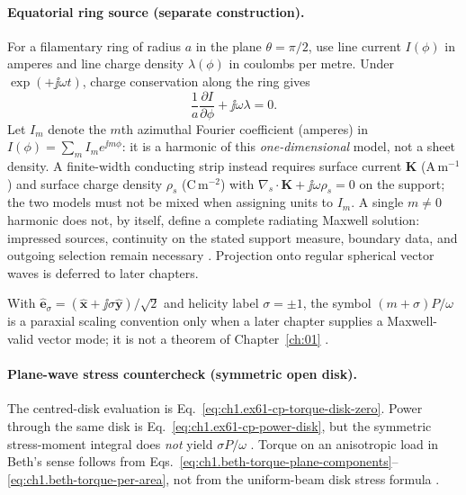 \paragraph{Equatorial ring source (separate construction).}
For a filamentary ring of radius $a$ in the plane $\theta=\pi/2$, use line current $I(\phi)$ in amperes and line charge density $\lambda(\phi)$ in coulombs per metre. Under $\exp(+\jj\omega t)$, charge conservation along the ring gives
\[
\frac{1}{a}\frac{\partial I}{\partial\phi}+\jj\omega\lambda=0.
\]
Let $I_m$ denote the $m$th azimuthal Fourier coefficient (amperes) in $I(\phi)=\sum_m I_m e^{\jj m\phi}$: it is a harmonic of this \emph{one-dimensional} model, not a sheet density. A finite-width conducting strip instead requires surface current $\mathbf K$ (A\,m$^{-1}$) and surface charge density $\rho_s$ (C\,m$^{-2}$) with $\nabla_s\cdot\mathbf K+\jj\omega\rho_s=0$ on the support; the two models must not be mixed when assigning units to $I_m$. A single $m\neq0$ harmonic does not, by itself, define a complete radiating Maxwell solution: impressed sources, continuity on the stated support measure, boundary data, and outgoing selection remain necessary \cite{stratton1941,tai1994}. Projection onto regular spherical vector waves is deferred to later chapters.
\begin{remark}[Modal $M=m+\sigma$ an illustrative estimate only]
\label{rem:ch1.m-plus-sigma}
With $\hat{\mathbf{e}}_\sigma=(\hat{\mathbf{x}}+\jj\sigma\hat{\mathbf{y}})/\sqrt{2}$ and helicity label $\sigma=\pm1$, the symbol $(m+\sigma)P/\omega$ is a paraxial scaling convention only when a later chapter supplies a Maxwell-valid vector mode; it is not a theorem of Chapter~\ref{ch:01} \cite{allen1992,cerjan2011,monteiro2009}.
\end{remark}

\paragraph{Plane-wave stress countercheck (symmetric open disk).}
The centred-disk evaluation is Eq.~\eqref{eq:ch1.ex61-cp-torque-disk-zero}. Power through the same disk is Eq.~\eqref{eq:ch1.ex61-cp-power-disk}, but the symmetric stress-moment integral does \emph{not} yield $\sigma P/\omega$ \cite{stratton1941,beth1936,stewart2005}. Torque on an anisotropic load in Beth's sense \cite{beth1936} follows from Eqs.~\eqref{eq:ch1.beth-torque-plane-components}--\eqref{eq:ch1.beth-torque-per-area}, not from the uniform-beam disk stress formula \cite{beth1936,stratton1941}.

